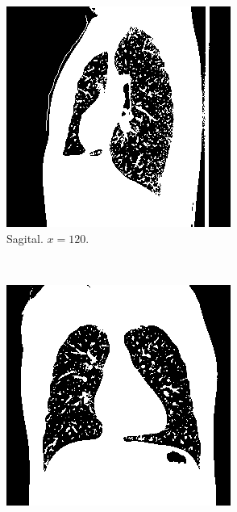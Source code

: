 \documentclass{article}
\begin{document}
\begin{figure}[H]
    \centering
    \begin{subfigure}[b]{0.3\textwidth}
        \includegraphics[width=\textwidth]{thorax/radiologist-sagital-gray.png}
        \caption{Sagital. $x=120$.}
    \end{subfigure}
    ~
    \begin{subfigure}[b]{0.3\textwidth}
        \includegraphics[width=\textwidth]{thorax/radiologist-coronal-gray.png}

\end{subfigure}
\end{figure}
\end{document}
